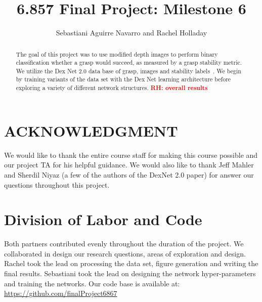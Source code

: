 \documentclass[letterpaper, 10 pt, conference]{../ieeeconf}
\newcommand{\rhnote}[1]{\ifthenelse{\boolean{include-notes}}%
 {\textcolor{red}{\textbf{RH: #1}}}{}}
\begin{document}
\title{6.857 Final Project: Milestone 6}
\author{Sebastiani Aguirre Navarro and Rachel Holladay}
\maketitle

\begin{abstract}
The goal of this project was to use modified depth images to perform binary classification whether a grasp would succeed, as measured by a grasp stability metric. 
We utilize the Dex Net 2.0 data base of grasp, images and stability labels~\cite{mahler2017dex}.
We begin by training variants of the data set with the Dex Net learning architecture before exploring a variety of different network structures. 
\rhnote{overall results}
\end{abstract}










\section*{ACKNOWLEDGMENT}
We would like to thank the entire course staff for making this course possible and our project TA for his helpful guidance. 
We would also like to thank Jeff Mahler and Sherdil Niyaz (a few of the authors of the DexNet 2.0 paper) for answer our questions throughout this project. 

\section*{Division of Labor and Code}
Both partners contributed evenly throughout the duration of the project. 
We collaborated in design our research questions, areas of exploration and design. Rachel took the lead on processing the data set, figure generation and writing the final results. Sebastiani took the lead on designing the network hyper-parameters and training the networks. 
Our code base is available at: \url{https://github.com/finalProject6867}

{\footnotesize
    
}
\end{document}
